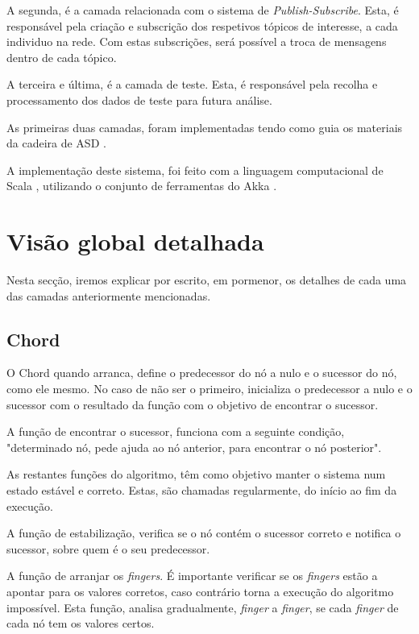 \documentclass[12pt]{article}
\begin{document}
A segunda, é a camada relacionada com o sistema de \emph{Publish-Subscribe}. Esta, é responsável pela criação e subscrição dos respetivos tópicos de interesse, a cada individuo na rede. Com estas subscrições, será possível a troca de mensagens dentro de cada tópico. 

A terceira e última, é a camada de teste. Esta, é responsável pela recolha e processamento dos dados de teste para futura análise.

As primeiras duas camadas, foram implementadas tendo como guia os materiais da cadeira de ASD \cite{b1}.

A implementação deste sistema, foi feito com a linguagem computacional de Scala \cite{b3}, utilizando o conjunto de ferramentas do Akka \cite{b4}.

\newpage
\section{Visão global detalhada}

Nesta secção, iremos explicar por escrito, em pormenor, os detalhes de cada uma das camadas anteriormente mencionadas.

\newpage
\subsection{Chord}

O Chord quando arranca, define o predecessor do nó a nulo e o sucessor do nó, como ele mesmo. No caso de não ser o primeiro, inicializa o predecessor a nulo e o sucessor com o resultado da função com o objetivo de encontrar o sucessor.

A função de encontrar o sucessor, funciona com a seguinte condição, "determinado nó, pede ajuda ao nó anterior, para encontrar o nó posterior".

As restantes funções do algoritmo, têm como objetivo manter o sistema num estado estável e correto. Estas, são chamadas regularmente, do início ao fim da execução.

A função de estabilização, verifica se o nó contém o sucessor correto e notifica o sucessor, sobre quem é o seu predecessor.

A função de arranjar os \emph{fingers}. É importante verificar se os \emph{fingers} estão a apontar para os valores corretos, caso contrário torna a execução do algoritmo impossível. Esta função, analisa gradualmente, \emph{finger} a \emph{finger}, se cada \emph{finger} de cada nó tem os valores certos. 
\end{document}
